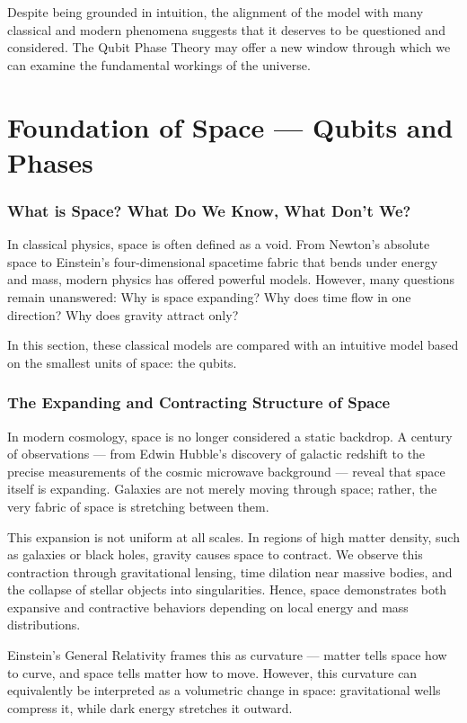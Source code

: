 \documentclass[12pt]{report} %
\begin{document}
Despite being grounded in intuition, the alignment of the model with many classical and modern phenomena suggests that it deserves to be questioned and considered. The Qubit Phase Theory may offer a new window through which we can examine the fundamental workings of the universe.
\newpage
\chapter{Foundation of Space — Qubits and Phases}

\subsection{What is Space? What Do We Know, What Don’t We?}

In classical physics, space is often defined as a void. From Newton’s absolute space to Einstein’s four-dimensional spacetime fabric that bends under energy and mass, modern physics has offered powerful models. However, many questions remain unanswered: Why is space expanding? Why does time flow in one direction? Why does gravity attract only?

In this section, these classical models are compared with an intuitive model based on the smallest units of space: the qubits.

\subsection{The Expanding and Contracting Structure of Space}

In modern cosmology, space is no longer considered a static backdrop. A century of observations — from Edwin Hubble’s discovery of galactic redshift to the precise measurements of the cosmic microwave background — reveal that space itself is expanding. Galaxies are not merely moving through space; rather, the very fabric of space is stretching between them.

This expansion is not uniform at all scales. In regions of high matter density, such as galaxies or black holes, gravity causes space to contract. We observe this contraction through gravitational lensing, time dilation near massive bodies, and the collapse of stellar objects into singularities. Hence, space demonstrates both expansive and contractive behaviors depending on local energy and mass distributions.

Einstein’s General Relativity frames this as curvature — matter tells space how to curve, and space tells matter how to move. However, this curvature can equivalently be interpreted as a volumetric change in space: gravitational wells compress it, while dark energy stretches it outward.
\end{document}
